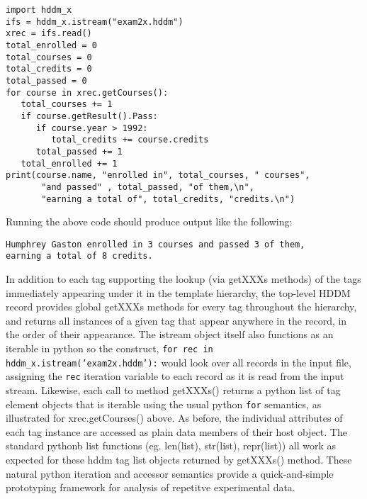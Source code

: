 \documentclass{revtex4}
\begin{document}
\vspace{0.5cm}
\begin{minipage}{12cm}
\begin{verbatim}
import hddm_x
ifs = hddm_x.istream("exam2x.hddm")
xrec = ifs.read()
total_enrolled = 0
total_courses = 0
total_credits = 0
total_passed = 0
for course in xrec.getCourses():
   total_courses += 1
   if course.getResult().Pass:
      if course.year > 1992:
         total_credits += course.credits
      total_passed += 1
   total_enrolled += 1
print(course.name, "enrolled in", total_courses, " courses",
       "and passed" , total_passed, "of them,\n",
       "earning a total of", total_credits, "credits.\n")
\end{verbatim}
\end{minipage}
\vspace{0.5cm}

Running the above code should produce output like the following:

\vspace{0.5cm}
\begin{minipage}{12cm}
\begin{verbatim}
Humphrey Gaston enrolled in 3 courses and passed 3 of them,
earning a total of 8 credits.
\end{verbatim}
\end{minipage}
\vspace{0.5cm}

In addition to each tag supporting the lookup (via getXXXs methods) of the
tags immediately appearing under it in the template hierarchy, the 
top-{}level HDDM record provides global getXXXs methods for every tag
throughout the hierarchy, and returns all instances of a given tag that
appear anywhere in the record, in the order of their appearance. The
istream object itself also functions as an iterable in python so the
construct, \texttt{for rec in hddm\_x.istream('exam2x.hddm'):} would
look over all records in the input file, assigning the \texttt{rec}
iteration variable to each record as it is read from the input stream.
Likewise, each call to method getXXXs() returns a python list of tag
element objects that is iterable using the usual python \texttt{for}
semantics, as illustrated for xrec.getCourses() above. As before, the
individual attributes of each tag instance are accessed as plain data 
members of their host object. The standard pythonb list functions (eg.
len(list), str(list), repr(list)) all work as expected for these hddm
tag list objects returned by getXXXs() method. These natural python
iteration and accessor semantics provide a quick-{}and-{}simple
prototyping framework for analysis of repetitve experimental data.
\end{document}
